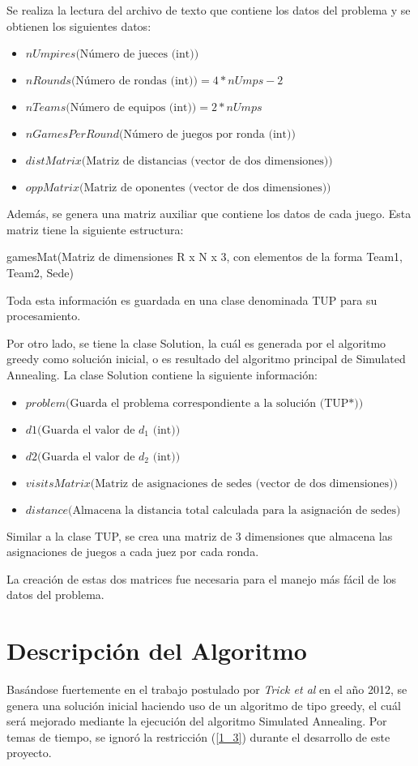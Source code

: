 \documentclass[letter, 10pt]{article}
\begin{document}
Se realiza la lectura del archivo de texto que contiene los datos del problema y se obtienen los siguientes datos:
\begin{itemize}
  \item $nUmpires\text{(N\'umero de jueces (int))}$
  \item $nRounds\text{(N\'umero de rondas (int))} = 4*nUmps - 2$
  \item $nTeams\text{(N\'umero de equipos (int))} = 2*nUmps$
  \item $nGamesPerRound\text{(N\'umero de juegos por ronda (int))}$
  \item $distMatrix\text{(Matriz de distancias (vector de dos dimensiones))}$
  \item $oppMatrix\text{(Matriz de oponentes (vector de dos dimensiones))}$
\end{itemize}
Adem\'as, se genera una matriz auxiliar que contiene los datos de cada juego. Esta matriz tiene la siguiente estructura:

gamesMat(Matriz de dimensiones R x N x 3, con elementos de la forma {Team1, Team2, Sede})

Toda esta informaci\'on es guardada en una clase denominada TUP para su procesamiento.

Por otro lado, se tiene la clase Solution, la cu\'al es generada por el algoritmo greedy como soluci\'on inicial, o es resultado del algoritmo principal de Simulated Annealing. La clase Solution contiene la siguiente informaci\'on:

\begin{itemize}
  \item $problem\text{(Guarda el problema correspondiente a la soluci\'on (TUP*))}$
  \item $d1\text{(Guarda el valor de $d_1$ (int))}$
  \item $d2\text{(Guarda el valor de $d_2$ (int))}$
  \item $visitsMatrix\text{(Matriz de asignaciones de sedes (vector de dos dimensiones))}$
  \item $distance\text{(Almacena la distancia total calculada para la asignaci\'on de sedes)}$
\end{itemize}
Similar a la clase TUP, se crea una matriz de 3 dimensiones que almacena las asignaciones de juegos a cada juez por cada ronda.

La creaci\'on de estas dos matrices fue necesaria para el manejo m\'as f\'acil de los datos del problema.


\section{Descripci\'on del Algoritmo}
Bas\'andose fuertemente en el trabajo postulado por \emph{Trick et al} en el a\~no 2012\cite{trick_2012}, se genera una soluci\'on inicial haciendo uso de un algoritmo de tipo greedy, el cu\'al ser\'a mejorado mediante la ejecuci\'on del algoritmo Simulated Annealing.
Por temas de tiempo, se ignor\'o la restricci\'on (\ref{1_3}) durante el desarrollo de este proyecto.
\end{document}
